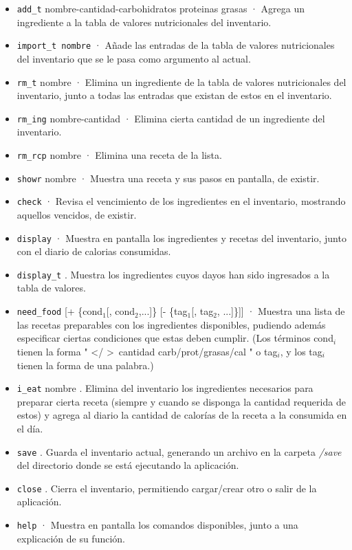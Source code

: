 \documentclass[a4paper]{article}
\begin{document}
\begin{itemize}
\item \texttt{add\_t} nombre-cantidad-carbohidratos proteinas grasas · Agrega un ingrediente a la tabla de valores nutricionales del inventario. 
\item \texttt{import\_t nombre} · Añade las entradas de la tabla de valores nutricionales del inventario que se le pasa como argumento al actual.
\item \texttt{rm\_t} nombre · Elimina un ingrediente de la tabla de valores nutricionales del inventario, junto a todas las entradas que existan de estos en el inventario. 
\item \texttt{rm\_ing} nombre-cantidad · Elimina cierta cantidad de un ingrediente del inventario.
\item \texttt{rm\_rcp} nombre · Elimina una receta de la lista.
\item \texttt{showr} nombre · Muestra una receta y sus pasos en pantalla, de existir.
\item \texttt{check} · Revisa el vencimiento de los ingredientes en el inventario, mostrando aquellos vencidos, de existir.
\item \texttt{display} · Muestra en pantalla los ingredientes y recetas del inventario, junto con el diario de calorias consumidas.
\item \texttt{display\_t} . Muestra los ingredientes cuyos dayos han sido ingresados a la tabla de valores.
\item \texttt{need\_food} [+ \{cond$_1$[, cond$_2$,...]\} [- \{tag$_1$[, tag$_2$, ...]\}]] · Muestra una lista de las recetas preparables con los ingredientes disponibles, pudiendo además especificar ciertas condiciones que estas deben cumplir. (Los términos cond$_i$ tienen la forma " \textless / \textgreater  \ cantidad carb/prot/grasas/cal " o tag$_i$, y los tag$_i$ tienen la forma de una palabra.)
\item \texttt{i\_eat} nombre . Elimina del inventario los ingredientes necesarios para preparar cierta receta (siempre y cuando se disponga la cantidad requerida de estos) y agrega al diario la cantidad de calorías de la receta a la consumida en el día.
\item \texttt{save} . Guarda el inventario actual, generando un archivo en la carpeta \textit{/save} del directorio donde se está ejecutando la aplicación.
\item \texttt{close} . Cierra el inventario, permitiendo cargar/crear otro o salir de la aplicación.
\item \texttt{help} · Muestra en pantalla los comandos disponibles, junto a una explicación de su función.
\end{itemize} 
\end{document}
